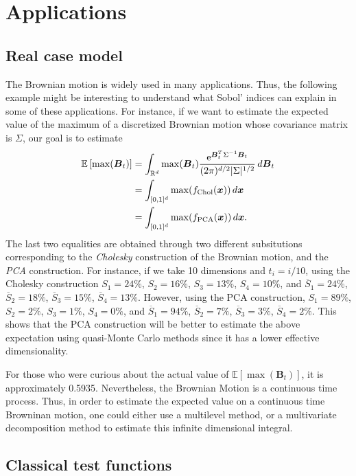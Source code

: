 \documentclass[]{elsarticle}
\theoremstyle{definition}
\newcommand{\bvec}[1]{\boldsymbol{#1}}
\newcommand{\vx}{\bvec{x}}
\begin{document}
\section{Applications}
\label{appli}
\subsection{Real case model}
The Brownian motion is widely used in many applications. Thus, the following example might be interesting to understand what Sobol' indices can explain in some of these applications. For instance, if we want to estimate the expected value of the maximum of a discretized Brownian motion whose covariance matrix is $\Sigma$, our goal is to estimate
\begin{align*}
\mathbb{E} \left[\max(\bvec{B}_t)\right] &= \int_{\mathbb{R}^d} \max(\bvec{B}_t) \frac{{\rm e}^{\bvec{B}_t^T\Sigma^{-1}\bvec{B}_t}}{(2\pi)^{d/2}|\Sigma|^{1/2}}\,d\bvec{B}_t \\
&= \int_{[0,1]^d} \max(f_{\rm Chol}(\vx)) \,d\vx \\
&= \int_{[0,1]^d} \max(f_{\rm PCA}(\vx)) \,d\vx.
\end{align*}
The last two equalities are obtained through two different subsitutions corresponding to the \textit{Cholesky} construction of the Brownian motion, and the \textit{PCA} construction. For instance, if we take 10 dimensions and $t_i=i/10$, using the Cholesky construction $S_{1} = 24\%$, $S_{2} = 16\%$, $S_{3} = 13\%$, $S_{4} = 10\%$, and $\overline{S}_{1}=24\%$, $\overline{S}_{2}=18\%$, $\overline{S}_{3}=15\%$, $\overline{S}_{4} = 13\%$. However, using the PCA construction, $S_{1} = 89\%$, $S_{2} = 2\%$, $S_{3} = 1\%$, $S_{4} = 0\%$, and $\overline{S}_{1}=94\%$, $\overline{S}_{2}=7\%$, $\overline{S}_{3}=3\%$, $\overline{S}_{4} = 2\%$. This shows that the PCA construction will be better to estimate the above expectation using quasi-Monte Carlo methods since it has a lower effective dimensionality.

For those who were curious about the actual value of $\mathbb{E} \left[\max(\bvec{B}_t)\right]$, it is approximately 0.5935. Nevertheless, the Brownian Motion is a continuous time process. Thus, in order to estimate the expected value on a continuous time Browninan motion, one could either use a multilevel method, or a multivariate decomposition method to estimate this infinite dimensional integral.

\subsection{Classical test functions}
\end{document}
